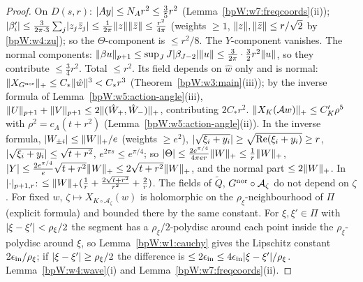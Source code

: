 \begin{proof}
\label{stepW:w5:i-q} On $D(s,r)$: $\lvert Ay\rvert\le N_A r^2\le\frac35r^2$
(Lemma~\ref{bpW:w7:freqcoords}(ii)); $\lvert \beta'_i\rvert\le\frac{3}{2\pi\cdot3}\sum_j\lvert z_j\bar z_j\rvert\le\frac1{2\pi}\lVert z\rVert\lVert \bar z\rVert\le\frac{r^2}{4\pi}$
(weights $\ge1$, $\lVert z\rVert,\lVert \bar z\rVert\le r/\sqrt2$ by \eqref{bpW:w4:zu}); so the $\Theta$-component is $\le r^2/8$. The $Y$-component
vanishes. The normal components: $\lVert \beta u\rVert_{p+1}\le\sup_J J\lvert \beta_{J-2}\rvert\lVert u\rVert\le\frac3{2\pi}\cdot\frac32r^2\lVert u\rVert$, so
they contribute $\le\frac34r^2$. Total $\le r^2$.
\label{stepW:w5:i-g} Its field depends on $\hat w$ only and is normal:
$\lVert X_{G^{\rm nor}}\rVert_+\le C_*\lVert \hat w\rVert^3<C_*r^3$ (Theorem~\ref{bpW:w3:main}(iii)); by the inverse formula of
Lemma~\ref{bpW:w5:action-angle}(iii), $\lVert U\rVert_{p+1}+\lVert V\rVert_{p+1}\le2\lVert (\hat W_+,\hat W_-)\rVert_+$, contributing $2C_*r^2$.
\label{stepW:w5:i-k} $\lVert X_K(\mathcal Aw)\rVert_+\le C'_K\rho^5$ with $\rho^2=c_A(t+r^2)$ (Lemma~\ref{bpW:w5:action-angle}(ii)).
In the inverse formula, $\lvert W_{\pm i}\rvert\le\lVert W\rVert_+/e$ (weights $\ge e^2$), $\lvert \sqrt{\xi_i+y_i}\rvert\ge\sqrt{\operatorname{Re}(\xi_i+y_i)}\ge r$,
$\lvert \sqrt{\xi_i+y_i}\rvert\le\sqrt{t+r^2}$, $e^{2\pi s}\le e^{\pi/4}$; so
$\lvert \Theta\rvert\le\frac{2e^{\pi/4}}{4\pi e r}\lVert W\rVert_+\le\frac1r\lVert W\rVert_+$, $\lvert Y\rvert\le\frac{2e^{\pi/4}}{e}\sqrt{t+r^2}\lVert W\rVert_+\le2\sqrt{t+r^2}\lVert W\rVert_+$,
and the normal part $\le2\lVert W\rVert_+$. In $\lvert \cdot\rvert_{p+1,r}$: $\le\lVert W\rVert_+(\frac1r+\frac{2\sqrt{t+r^2}}{r^2}+\frac2r)$.
\label{stepW:w5:i-par} The fields of $\tilde Q$, $G^{\rm nor}\circ\mathcal A_\zeta$ do not depend on $\zeta$.
For fixed $w$, $\zeta\mapsto X_{K\circ\mathcal A_\zeta}(w)$ is holomorphic on the $\rho_\xi$-neighbourhood of $\Pi$ (explicit
formula) and bounded there by the same constant. For $\xi,\xi'\in\Pi$ with $\lvert \xi-\xi'\rvert<\rho_\xi/2$ the segment has a
$\rho_\xi/2$-polydisc around each point inside the $\rho_\xi$-polydisc around $\xi$, so Lemma~\ref{bpW:w1:cauchy} gives the Lipschitz
constant $2\epsilon_{\rm in}/\rho_\xi$; if $\lvert \xi-\xi'\rvert\ge\rho_\xi/2$ the difference is $\le2\epsilon_{\rm in}\le4\epsilon_{\rm in}\lvert \xi-\xi'\rvert/\rho_\xi$.
\label{stepW:w5:i-freq} Lemma~\ref{bpW:w4:wave}(i) and Lemma~\ref{bpW:w7:freqcoords}(ii).
\end{proof}

